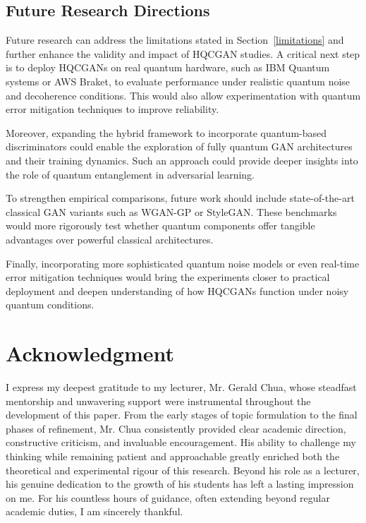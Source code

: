 \documentclass[conference]{IEEEtran}
\begin{document}
\subsection{Future Research Directions}

Future research can address the limitations stated in Section~\ref{limitations} and further enhance the validity and impact of HQCGAN studies. A critical next step is to deploy HQCGANs on real quantum hardware, such as IBM Quantum systems or AWS Braket, to evaluate performance under realistic quantum noise and decoherence conditions. This would also allow experimentation with quantum error mitigation techniques to improve reliability.

Moreover, expanding the hybrid framework to incorporate quantum-based discriminators could enable the exploration of fully quantum GAN architectures and their training dynamics. Such an approach could provide deeper insights into the role of quantum entanglement in adversarial learning.

To strengthen empirical comparisons, future work should include state-of-the-art classical GAN variants such as WGAN-GP or StyleGAN. These benchmarks would more rigorously test whether quantum components offer tangible advantages over powerful classical architectures.

Finally, incorporating more sophisticated quantum noise models or even real-time error mitigation techniques would bring the experiments closer to practical deployment and deepen understanding of how HQCGANs function under noisy quantum conditions.

\section*{Acknowledgment}

I express my deepest gratitude to my lecturer, Mr. Gerald Chua, whose steadfast mentorship and unwavering support were instrumental throughout the development of this paper. From the early stages of topic formulation to the final phases of refinement, Mr. Chua consistently provided clear academic direction, constructive criticism, and invaluable encouragement. His ability to challenge my thinking while remaining patient and approachable greatly enriched both the theoretical and experimental rigour of this research. Beyond his role as a lecturer, his genuine dedication to the growth of his students has left a lasting impression on me. For his countless hours of guidance, often extending beyond regular academic duties, I am sincerely thankful.
\end{document}
